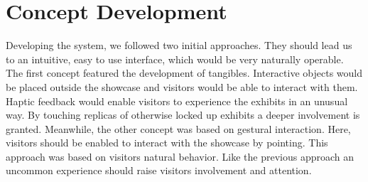 %


%


\section{Concept Development}
\label{conception_constraints}

Developing the system, we followed two initial approaches. They should lead us to an intuitive, easy to use interface, which would be very naturally operable. The first concept featured the development of tangibles. Interactive objects would be placed outside the showcase and visitors would be able to interact with them. Haptic feedback would enable visitors to experience the exhibits in an unusual way. By touching replicas of otherwise locked up exhibits a deeper involvement is granted. Meanwhile, the other concept was based on gestural interaction. Here, visitors should be enabled to interact with the showcase by pointing. This approach was based on visitors natural behavior. Like the previous approach an uncommon experience should raise visitors involvement and attention.

